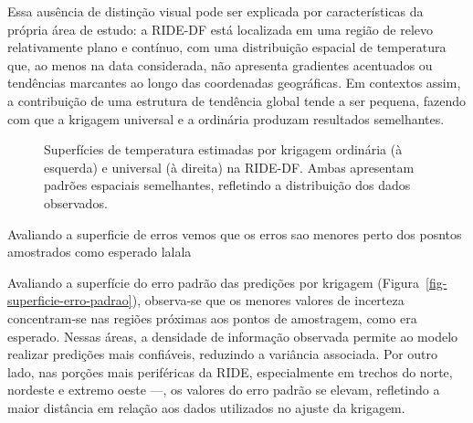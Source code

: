 \documentclass[
  letterpaper,
  DIV=11,
  numbers=noendperiod]{scrartcl}
\begin{document}
Essa ausência de distinção visual pode ser explicada por características
da própria área de estudo: a RIDE-DF está localizada em uma região de
relevo relativamente plano e contínuo, com uma distribuição espacial de
temperatura que, ao menos na data considerada, não apresenta gradientes
acentuados ou tendências marcantes ao longo das coordenadas geográficas.
Em contextos assim, a contribuição de uma estrutura de tendência global
tende a ser pequena, fazendo com que a krigagem universal e a ordinária
produzam resultados semelhantes.

\label{cell-fig-krigagem-comparacao}
\begin{figure}[H]


\caption{\label{fig-krigagem-comparacao}Superfícies de temperatura
estimadas por krigagem ordinária (à esquerda) e universal (à direita) na
RIDE-DF. Ambas apresentam padrões espaciais semelhantes, refletindo a
distribuição dos dados observados.}

\end{figure}%

Avaliando a superficie de erros vemos que os erros sao menores perto dos
posntos amostrados como esperado lalala

Avaliando a superfície do erro padrão das predições por krigagem
(Figura~\ref{fig-superficie-erro-padrao}), observa-se que os menores
valores de incerteza concentram-se nas regiões próximas aos pontos de
amostragem, como era esperado. Nessas áreas, a densidade de informação
observada permite ao modelo realizar predições mais confiáveis,
reduzindo a variância associada. Por outro lado, nas porções mais
periféricas da RIDE, especialmente em trechos do norte, nordeste e
extremo oeste ---, os valores do erro padrão se elevam, refletindo a
maior distância em relação aos dados utilizados no ajuste da krigagem.
\end{document}

